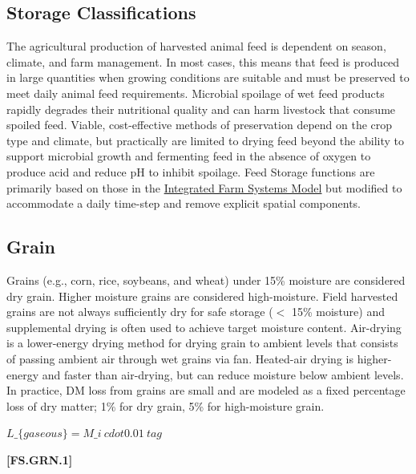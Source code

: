 \begin{refsection}
\section{Storage Classifications}
The agricultural production of harvested animal feed is dependent on season, climate, and farm management. In most cases, this means that feed is produced in large quantities when growing conditions are suitable and must be preserved to meet daily animal feed requirements. Microbial spoilage of wet feed products rapidly degrades their nutritional quality and can harm livestock that consume spoiled feed. Viable, cost-effective methods of preservation depend on the crop type and climate, but practically are limited to drying feed beyond the ability to support microbial growth and fermenting feed in the absence of oxygen to produce acid and reduce pH to inhibit spoilage. Feed Storage functions are primarily based on those in the \href{https://www.ars.usda.gov/northeast-area/up-pa/pswmru/docs/integrated-farm-system-model/}{Integrated Farm Systems Model} but modified to accommodate a daily time-step and remove explicit spatial components.



\subsection{Grain} Grains (e.g., corn, rice, soybeans, and wheat) under 15\% moisture are considered dry grain. Higher moisture grains are considered high-moisture. Field harvested grains are not always sufficiently dry for safe storage (\(<\) 15\% moisture) and supplemental drying is often used to achieve target moisture content. Air-drying is a lower-energy drying method for drying grain to ambient levels that consists of passing ambient air through wet grains via fan. Heated-air drying is higher-energy and faster than air-drying, but can reduce moisture below ambient levels. In practice, DM loss from grains are small and are modeled as a fixed percentage loss of dry matter; 1\% for dry grain, 5\% for high-moisture grain.


    \begin{center}
        \(L\_\{gaseous\}  = M\_i\ cdot 0.01\ tag\)
    \end{center}
        \vspace{0.5cm}
    
            {\raggedleft \textbf{[FS.GRN.1]}\par}
            \vspace{0.5cm}


\end{refsection}
